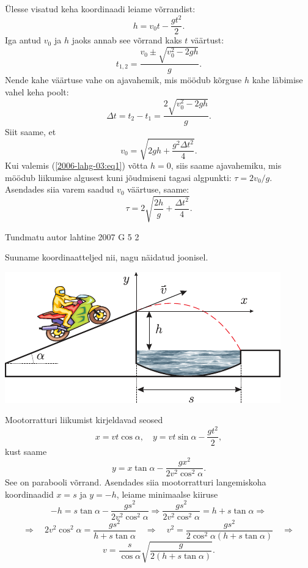 \documentclass[11pt]{article}
\begin{document}
{{\ifSolution
Ülesse visatud keha koordinaadi leiame võrrandist: 
\[
h = v_0t - \frac{gt^2}{2}.
\]
Iga antud $v_0$ ja $h$ jaoks annab see võrrand kaks $t$ väärtust:
\[
t_{1,2}=\frac{v_{0} \pm \sqrt{v_{0}^{2}-2 g h}}{g}.
\]
Nende kahe väärtuse vahe on ajavahemik, mis möödub kõrguse $h$ kahe läbimise vahel keha poolt:
\begin{equation} \label{2006-lahg-03:eq1}
\Delta t=t_{2}-t_{1}=\frac{2 \sqrt{v_{0}^{2}-2 g h}}{g}.
\end{equation}
Siit saame, et
\[
v_{0}=\sqrt{2 g h+\frac{g^{2} \Delta t^{2}}{4}}.
\]
Kui valemis (\ref{2006-lahg-03:eq1}) võtta $h = 0$, siis saame ajavahemiku, mis möödub liikumise algusest kuni jõudmiseni tagasi algpunkti: $\tau = 2v_0/g$. Asendades siia varem saadud $v_0$ väärtuse, saame:
\[
\tau=2 \sqrt{\frac{2 h}{g}+\frac{\Delta t^{2}}{4}}.
\]
\fi
}

{Tundmatu autor} %
{lahtine} %
{2007} %
{G 5} %
{2} %
{

\ifSolution
Suuname koordinaatteljed nii, nagu näidatud joonisel.

\begin{center}
	\includegraphics[width=0.8\linewidth]{2007-lahg-05-lah}
\end{center}

Mootorratturi liikumist kirjeldavad seosed
\[
x=v t \cos \alpha, \quad y=v t \sin \alpha-\frac{g t^{2}}{2},
\]
kust saame
\[
y=x \tan \alpha-\frac{g x^{2}}{2 v^{2} \cos ^{2} \alpha}.
\]
See on parabooli võrrand. Asendades siia mootorratturi langemiskoha koordinaadid $x = s$ ja $y = -h$, leiame minimaalse kiiruse
\[
-h=s \tan \alpha-\frac{g s^{2}}{2 v^{2} \cos ^{2} \alpha} \Rightarrow \frac{g s^{2}}{2 v^{2} \cos ^{2} \alpha}=h+s \tan \alpha \Rightarrow
\]
\[
\Rightarrow \quad 2 v^{2} \cos ^{2} \alpha=\frac{g s^{2}}{h+s \tan \alpha} \quad \Rightarrow \quad v^{2}=\frac{g s^{2}}{2 \cos ^{2} \alpha(h+s \tan \alpha)} \quad \Rightarrow
\]
\[
v=\frac{s}{\cos \alpha} \sqrt{\frac{g}{2(h+s \tan \alpha)}}.
\]
\fi
}

}
\end{document}
